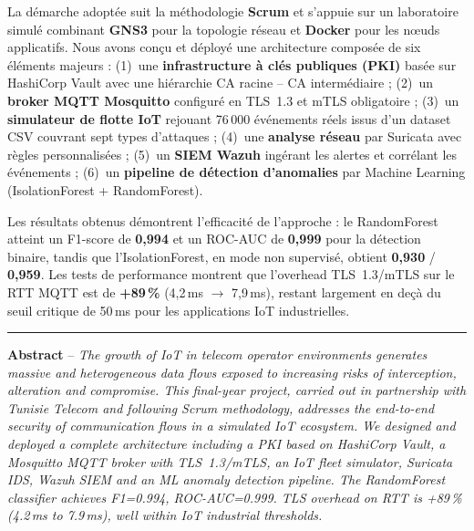 La démarche adoptée suit la méthodologie \textbf{Scrum} et s'appuie sur un laboratoire simulé combinant \textbf{GNS3} pour la topologie réseau et \textbf{Docker} pour les nœuds applicatifs. Nous avons conçu et déployé une architecture composée de six éléments majeurs : (1)~une \textbf{infrastructure à clés publiques (PKI)} basée sur HashiCorp Vault avec une hiérarchie CA racine -- CA intermédiaire ; (2)~un \textbf{broker MQTT Mosquitto} configuré en TLS~1.3 et mTLS obligatoire ; (3)~un \textbf{simulateur de flotte IoT} rejouant 76\,000 événements réels issus d'un dataset CSV couvrant sept types d'attaques ; (4)~une \textbf{analyse réseau} par Suricata avec règles personnalisées ; (5)~un \textbf{SIEM Wazuh} ingérant les alertes et corrélant les événements ; (6)~un \textbf{pipeline de détection d'anomalies} par Machine Learning (IsolationForest + RandomForest).

Les résultats obtenus démontrent l'efficacité de l'approche : le RandomForest atteint un F1-score de \textbf{0,994} et un ROC-AUC de \textbf{0,999} pour la détection binaire, tandis que l'IsolationForest, en mode non supervisé, obtient \textbf{0,930} / \textbf{0,959}. Les tests de performance montrent que l'overhead TLS~1.3/mTLS sur le RTT MQTT est de \textbf{+89\,\%} (4,2\,ms $\to$ 7,9\,ms), restant largement en deçà du seuil critique de 50\,ms pour les applications IoT industrielles.

\vspace{0.5cm}
\hrule
\vspace{0.3cm}

\textbf{Abstract} -- \textit{The growth of IoT in telecom operator environments generates massive and heterogeneous data flows exposed to increasing risks of interception, alteration and compromise. This final-year project, carried out in partnership with Tunisie Telecom and following Scrum methodology, addresses the end-to-end security of communication flows in a simulated IoT ecosystem. We designed and deployed a complete architecture including a PKI based on HashiCorp Vault, a Mosquitto MQTT broker with TLS~1.3/mTLS, an IoT fleet simulator, Suricata IDS, Wazuh SIEM and an ML anomaly detection pipeline. The RandomForest classifier achieves F1=0.994, ROC-AUC=0.999. TLS overhead on RTT is +89\,\% (4.2\,ms to 7.9\,ms), well within IoT industrial thresholds.}

\cleardoublepage
